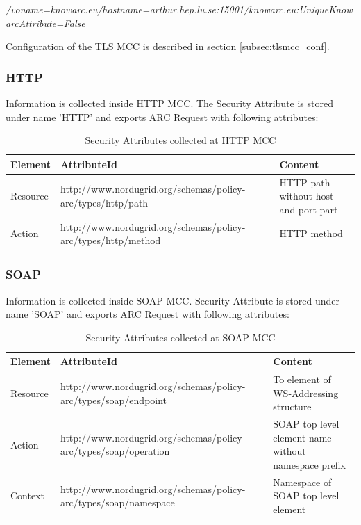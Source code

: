 \documentclass{article}                            %
\begin{document}
\emph{/voname=knowarc.eu/hostname=arthur.hep.lu.se:15001/knowarc.eu:UniqueKnowarcAttribute=False}

Configuration of the TLS MCC is described in section \ref{subsec:tlsmcc_conf}.



\subsubsection{HTTP} %
\label{subsubsec:sec_attr_HTTP}
Information is collected inside HTTP MCC. The Security Attribute is stored under name 'HTTP' and exports ARC Request with following attributes:

\begin{table}[ht]
\caption{Security Attributes collected at HTTP MCC}
\centering
\begin{tabular}{| l | p{7cm} | p{5cm} |}
\hline
\textbf{Element} & \textbf{AttributeId} & \textbf{Content} \\ \hline
Resource & http://www.nordugrid.org/schemas/policy-arc/types/http/path & HTTP path without host and port part \\ \hline
Action & http://www.nordugrid.org/schemas/policy-arc/types/http/method & HTTP method \\ \hline
\end{tabular}
\label{table:http_attr}
\end{table}


\subsubsection{SOAP} %
\label{subsubsec:sec_attr_SOAP}
Information is collected inside SOAP MCC. Security Attribute is stored under name 'SOAP' and exports ARC Request with following attributes:

\begin{table}[ht]
\caption{Security Attributes collected at SOAP MCC}
\centering
\begin{tabular}{| l | p{7cm} | p{5cm} |}
\hline
\textbf{Element} & \textbf{AttributeId} & \textbf{Content} \\ \hline
Resource & http://www.nordugrid.org/schemas/policy-arc/types/soap/endpoint & To element of WS-Addressing structure \\ \hline
Action & http://www.nordugrid.org/schemas/policy-arc/types/soap/operation & SOAP top level element name without namespace prefix \\ \hline
Context & http://www.nordugrid.org/schemas/policy-arc/types/soap/namespace & Namespace of SOAP top level element \\ \hline
\end{tabular}
\label{table:soap_attr}
\end{table}
\end{document}
